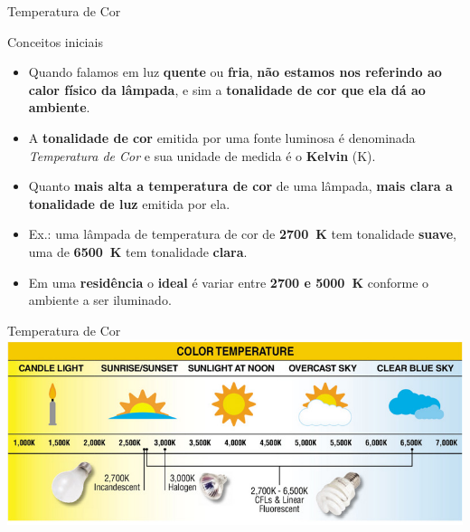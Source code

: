 \begin{frame}{Temperatura de Cor}
	\begin{block}{Conceitos iniciais}
		\begin{itemize}
			\item Quando falamos em luz \textbf{quente} ou \textbf{fria}, \textbf{não estamos nos referindo ao calor físico da lâmpada}, e sim a \textbf{tonalidade de cor que ela dá ao ambiente}.
			\item A \textbf{tonalidade de cor} emitida por uma fonte luminosa é denominada \textit{Temperatura de Cor} e sua unidade de medida é o \textbf{Kelvin} (\si{\kelvin}).
			\item Quanto \textbf{mais alta a temperatura de cor} de uma lâmpada, \textbf{mais clara a tonalidade de luz} emitida por ela.
			\item Ex.: uma lâmpada de temperatura de cor de \textbf{\SI{2700}{\kelvin}} tem tonalidade \textbf{suave}, uma de \textbf{\SI{6500}{\kelvin}} tem tonalidade \textbf{clara}.
			\item Em uma \textbf{residência} o \textbf{ideal} é variar entre \textbf{\num{2700} e \SI{5000}{\kelvin}} conforme o ambiente a ser iluminado.
		\end{itemize}
	\end{block}
\end{frame}


\begin{frame}{Temperatura de Cor}
	\centering
	\includegraphics[width=1\linewidth]{Figuras/Ch07/fig4}
\end{frame}



